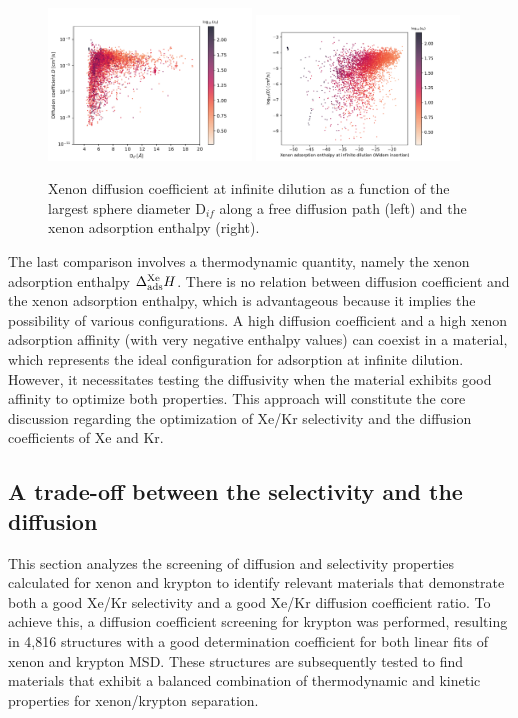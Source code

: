 \documentclass[main]{subfiles}
\begin{document}
\begin{figure}[ht]
  \centering
    \includegraphics[width=0.48\textwidth]{figures/5-diffusion/D_log-lcd_s_+.pdf}
    \includegraphics[width=0.48\textwidth]{figures/5-diffusion/D_log-H_Xe_s_+.pdf}
    \caption{Xenon diffusion coefficient at infinite dilution as a function of the largest sphere diameter D$_{if}$ along a free diffusion path (left) and the xenon adsorption enthalpy (right). }\label{fgr:diff_H_lcd}
\end{figure}

The last comparison involves a thermodynamic quantity, namely the xenon adsorption enthalpy $\Delta_{\text{ads}}^{\text{Xe}}H$. There is no relation between diffusion coefficient and the xenon adsorption enthalpy, which is advantageous because it implies the possibility of various configurations. A high diffusion coefficient and a high xenon adsorption affinity (with very negative enthalpy values) can coexist in a material, which represents the ideal configuration for adsorption at infinite dilution. However, it necessitates testing the diffusivity when the material exhibits good affinity to optimize both properties. This approach will constitute the core discussion regarding the optimization of Xe/Kr selectivity and the diffusion coefficients of Xe and Kr.  

\subsection{A trade-off between the selectivity and the diffusion}

This section analyzes the screening of diffusion and selectivity properties calculated for xenon and krypton to identify relevant materials that demonstrate both a good Xe/Kr selectivity and a good Xe/Kr diffusion coefficient ratio. To achieve this, a diffusion coefficient screening for krypton was performed, resulting in 4,816 structures with a good determination coefficient for both linear fits of xenon and krypton MSD. These structures are subsequently tested to find materials that exhibit a balanced combination of thermodynamic and kinetic properties for xenon/krypton separation.
\end{document}
